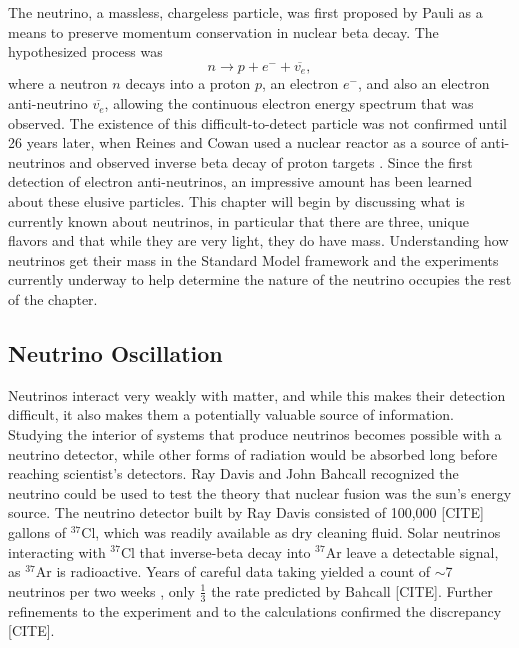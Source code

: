 The neutrino, a massless, chargeless particle, was first proposed by Pauli \cite{Pauli} as a means to preserve momentum conservation in nuclear beta decay.  The hypothesized process was
\begin{equation}
n \rightarrow p + e^- + \overline{v_e},
\end{equation}
where a neutron $n$ decays into a proton $p$, an electron $e^-$, and also an electron anti-neutrino $\overline{v_e}$, allowing the continuous electron energy spectrum that was observed. The existence of this difficult-to-detect particle was not confirmed until 26 years later, when Reines and Cowan used a nuclear reactor as a source of anti-neutrinos and observed inverse beta decay of proton targets \cite{poltergeist}.  Since the first detection of electron anti-neutrinos, an impressive amount has been learned about these elusive particles.  This chapter will begin by discussing what is currently known about neutrinos, in particular that there are three, unique flavors and that while they are very light, they do have mass.  Understanding how neutrinos get their mass in the Standard Model framework and the experiments currently underway to help determine the nature of the neutrino occupies the rest of the chapter.

\subsection{Neutrino Oscillation}
Neutrinos interact very weakly with matter, and while this makes their detection difficult, it also makes them a potentially valuable source of information.  Studying the interior of systems that produce neutrinos becomes possible with a neutrino detector, while other forms of radiation would be absorbed long before reaching scientist's detectors.  Ray Davis and John Bahcall recognized the neutrino could be used to test the theory that nuclear fusion was the sun's energy source.  The neutrino detector built by Ray Davis consisted of 100,000 [CITE] gallons of $^{37}$Cl, which was readily available as dry cleaning fluid.  Solar neutrinos interacting with $^{37}$Cl that inverse-beta decay into $^{37}$Ar leave a detectable signal, as $^{37}$Ar is radioactive.  Years of careful data taking yielded a count of $\sim$7 neutrinos per two weeks \cite{Davis}, only $\frac{1}{3}$ the rate predicted by Bahcall [CITE].  Further refinements to the experiment and to the calculations confirmed the discrepancy [CITE].

